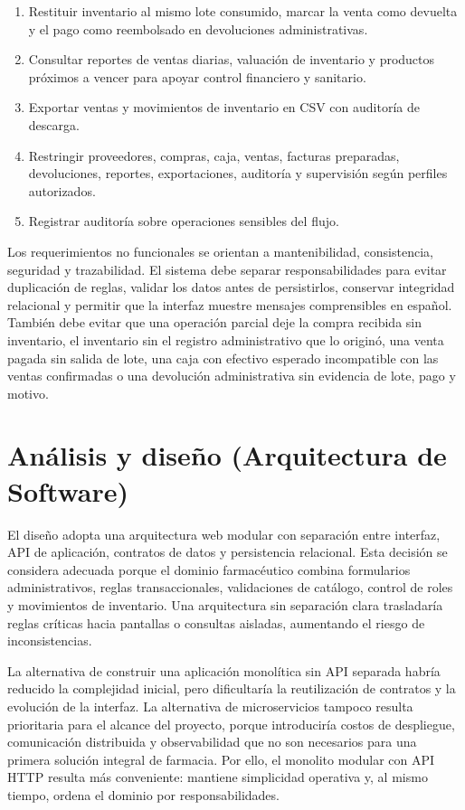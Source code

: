 \begin{enumerate}[label=\arabic*.]
  \item Restituir inventario al mismo lote consumido, marcar la venta como devuelta y el pago como reembolsado en devoluciones administrativas.
  \item Consultar reportes de ventas diarias, valuación de inventario y productos próximos a vencer para apoyar control financiero y sanitario.
  \item Exportar ventas y movimientos de inventario en CSV con auditoría de descarga.
  \item Restringir proveedores, compras, caja, ventas, facturas preparadas, devoluciones, reportes, exportaciones, auditoría y supervisión según perfiles autorizados.
  \item Registrar auditoría sobre operaciones sensibles del flujo.
\end{enumerate}

Los requerimientos no funcionales se orientan a mantenibilidad, consistencia, seguridad y trazabilidad. El sistema debe separar responsabilidades para evitar duplicación de reglas, validar los datos antes de persistirlos, conservar integridad relacional y permitir que la interfaz muestre mensajes comprensibles en español. También debe evitar que una operación parcial deje la compra recibida sin inventario, el inventario sin el registro administrativo que lo originó, una venta pagada sin salida de lote, una caja con efectivo esperado incompatible con las ventas confirmadas o una devolución administrativa sin evidencia de lote, pago y motivo.



\section{Análisis y diseño (Arquitectura de Software)}

El diseño adopta una arquitectura web modular con separación entre interfaz, API de aplicación, contratos de datos y persistencia relacional. Esta decisión se considera adecuada porque el dominio farmacéutico combina formularios administrativos, reglas transaccionales, validaciones de catálogo, control de roles y movimientos de inventario. Una arquitectura sin separación clara trasladaría reglas críticas hacia pantallas o consultas aisladas, aumentando el riesgo de inconsistencias.

La alternativa de construir una aplicación monolítica sin API separada habría reducido la complejidad inicial, pero dificultaría la reutilización de contratos y la evolución de la interfaz. La alternativa de microservicios tampoco resulta prioritaria para el alcance del proyecto, porque introduciría costos de despliegue, comunicación distribuida y observabilidad que no son necesarios para una primera solución integral de farmacia. Por ello, el monolito modular con API HTTP resulta más conveniente: mantiene simplicidad operativa y, al mismo tiempo, ordena el dominio por responsabilidades.

